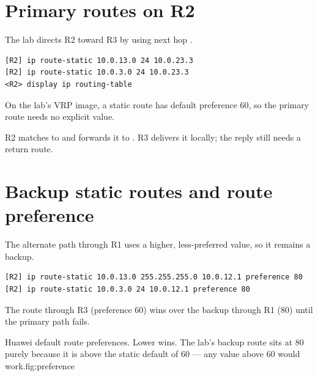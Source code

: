 \section{Primary routes on R2}
The lab directs R2 toward R3 by using next hop .
\begin{lstlisting}[style=dcnterminal]
[R2] ip route-static 10.0.13.0 24 10.0.23.3
[R2] ip route-static 10.0.3.0 24 10.0.23.3
<R2> display ip routing-table
\end{lstlisting}
On the lab's VRP image, a static route has default preference 60, so the primary route needs no explicit value.

\begin{workedexample}
R2 matches  to  and forwards it to . R3 delivers it locally; the reply still needs a return route.
\end{workedexample}

\section{Backup static routes and route preference}
The alternate path through R1 uses a higher, less-preferred value, so it remains a backup.
\begin{lstlisting}[style=dcnterminal]
[R2] ip route-static 10.0.13.0 255.255.255.0 10.0.12.1 preference 80
[R2] ip route-static 10.0.3.0 24 10.0.12.1 preference 80
\end{lstlisting}
The route through R3 (preference 60) wins over the backup through R1 (80) until the primary path fails.

\begin{utpfig}{Huawei default route preferences. Lower wins. The
lab's backup route sits at 80 purely because it is above the static default of 60
--- any value above 60 would work.}{fig:preference}
\end{utpfig}

